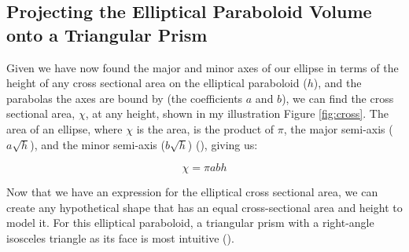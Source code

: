 \documentclass[12pt]{article}
\begin{document}
\subsection{Projecting the Elliptical Paraboloid Volume onto a Triangular Prism}

Given we have now found the major and minor axes of our ellipse in terms of the height of any cross sectional area on the elliptical paraboloid ($h$), and the parabolas the axes are bound by (the coefficients $a$ and $b$), we can find the cross sectional area, $\chi$, at any height, shown in my illustration Figure \ref{fig:cross}. The area of an ellipse, where $\chi$ is the area, is the product of $\pi$, the major semi-axis ($a \sqrt{h}$), and the minor semi-axis ($b \sqrt{h}$) (\citeauthor{weisstein}), giving us:

\vspace{-8mm}

\begin{equation}\label{solve chi}
    \boxed{\chi = \pi a b h}
\end{equation}

Now that we have an expression for the elliptical cross sectional area, we can create any hypothetical shape that has an equal cross-sectional area and height to model it. For this elliptical paraboloid, a triangular prism with a right-angle isosceles triangle as its face is most intuitive (\citeauthor{bogomolny}). 
\end{document}
